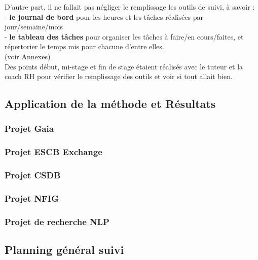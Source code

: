 D'autre part, il ne fallait pas négliger le remplissage les outils de suivi, à savoir : \\
- \textbf{le journal de bord} pour les heures et les tâches réalisées par jour/semaine/mois\\ 
- \textbf{le tableau des tâches} pour organiser les tâches à faire/en cours/faites, et répertorier le temps mis pour chacune d'entre elles.\\
(voir Annexes)\\

Des points début, mi-stage et fin de stage étaient réalisés avec le tuteur et la coach RH pour vérifier le remplissage des outils et voir si tout allait bien.

\pagebreak
\subsection{Application de la méthode et Résultats}

\subsubsection{Projet Gaia}


\subsubsection{Projet ESCB Exchange}

\subsubsection{Projet CSDB}

\subsubsection{Projet NFIG}

\subsubsection{Projet de recherche NLP}

\subsection{Planning général suivi}